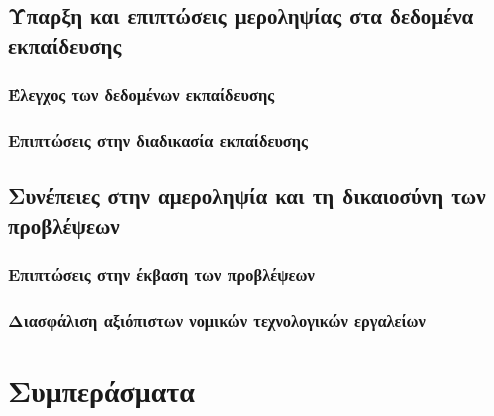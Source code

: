 \documentclass{article}
\begin{document}
\subsection{Ύπαρξη και επιπτώσεις μεροληψίας στα δεδομένα εκπαίδευσης}

\subsubsection{Έλεγχος των δεδομένων εκπαίδευσης}


\subsubsection{Επιπτώσεις στην διαδικασία εκπαίδευσης}


\subsection{Συνέπειες στην αμεροληψία και τη δικαιοσύνη των προβλέψεων}

\subsubsection{Επιπτώσεις στην έκβαση των προβλέψεων}


\subsubsection{Διασφάλιση αξιόπιστων νομικών τεχνολογικών εργαλείων}


\section{Συμπεράσματα}




\end{document}
